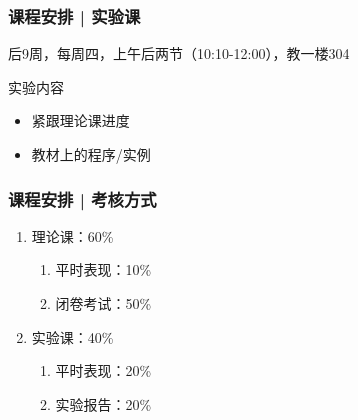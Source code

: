 \begin{frame}
  \frametitle{课程安排 | 实验课}
  \begin{center}
  \alert{后9周，每周四，上午后两节（10:10-12:00），教一楼304}\\
  \vspace{0.2cm}
  \end{center}
  \begin{block}{实验内容}
    \begin{itemize}
      \item 紧跟理论课进度
      \item 教材上的程序/实例
    \end{itemize}
  \end{block}
\end{frame}

\begin{frame}
  \frametitle{课程安排 | 考核方式}
  \begin{enumerate}
    \item 理论课：60\%
      \begin{enumerate}
        \item 平时表现：10\%
        \item 闭卷考试：50\%
      \end{enumerate}
    \item 实验课：40\%
      \begin{enumerate}
        \item 平时表现：20\%
        \item 实验报告：20\%
      \end{enumerate}
  \end{enumerate}
\end{frame}

